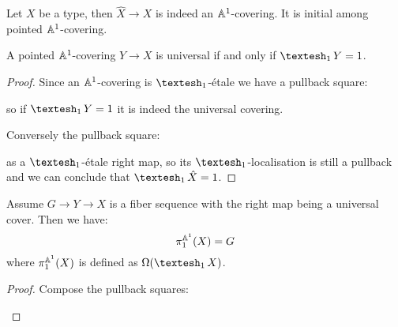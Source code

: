 \begin{proposition}
  Let $X$ be a type, then $\hat{X}\to X$ is indeed an $\mathbb{A}^1$-covering. It is initial among pointed $\mathbb{A}^1$-covering.
\end{proposition}

\begin{proposition}\label{universal-cover-contractible}
A pointed $\mathbb{A}^1$-covering $Y\to X$ is universal if and only if $\shape_1 Y = 1$.
\end{proposition}

\begin{proof}
Since an $\mathbb{A}^1$-covering is $\shape_1$-étale we have a pullback square:
  \begin{center}
  \end{center}
  so if $\shape_1Y = 1$ it is indeed the universal covering.
  
  Conversely the pullback square:
    \begin{center}
  \end{center}
  as a $\shape_1$-étale right map, so its $\shape_1$-localisation is still a pullback and we can conclude that $\shape_1\hat{X} = 1$.
\end{proof}

\begin{proposition}\label{universal-cover-pi1}
Assume $G\to Y\to X$ is a fiber sequence with the right map being a universal cover. Then we have:
\[\pi_1^{\mathbb{A}^1}(X) = G\]
where $\pi_1^{\mathbb{A}^1}(X)$ is defined as $\Omega (\shape_1 X)$.
\end{proposition}

\begin{proof}
Compose the pullback squares:
    \begin{center}
  \end{center}
\end{proof}
